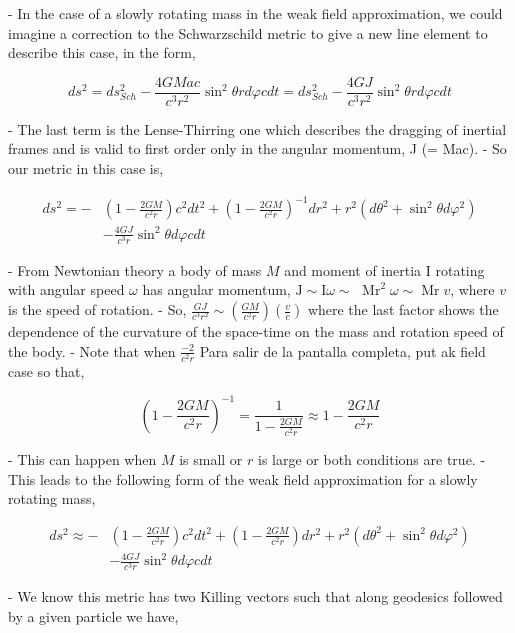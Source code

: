 - In the case of a slowly rotating mass in the weak field approximation, we could imagine a correction to the Schwarzschild metric to give a new line element to describe this case, in the form,

$$
    d s^2=d s_{S c h}^2-\frac{4 G M a c}{c^3 r^2} \sin ^2 \theta r d \varphi c d t=d s_{S c h}^2-\frac{4 G J}{c^3 r^2} \sin ^2 \theta r d \varphi c d t
$$

- The last term is the Lense-Thirring one which describes the dragging of inertial frames and is valid to first order only in the angular momentum, J (= Mac).
- So our metric in this case is,


\begin{align}
    d s^2=- & \left(1-\frac{2 G M}{c^2 r}\right) c^2 d t^2+\left(1-\frac{2 G M}{c^2 r}\right)^{-1} d r^2+r^2\left(d \theta^2+\sin ^2 \theta d \varphi^2\right) \\
            & -\frac{4 G J}{c^3 r} \sin ^2 \theta d \varphi c d t
\end{align}


- From Newtonian theory a body of mass $M$ and moment of inertia I rotating with angular speed $\omega$ has angular momentum, $\mathrm{J} \sim \mathrm{I} \omega \sim$ $\operatorname{Mr}^2 \omega \sim \operatorname{Mr} v$, where $v$ is the speed of rotation.
- So, $\frac{G J}{c^3 r^2} \sim\left(\frac{G M}{c^2 r}\right)\left(\frac{v}{c}\right)$ where the last factor shows the dependence of the curvature of the space-time on the mass and rotation speed of the body.
- Note that when $\frac{-2}{c^2 r}$ Para salir de la pantalla completa, put ak field case so that,

$$
    \left(1-\frac{2 G M}{c^2 r}\right)^{-1}=\frac{1}{1-\frac{2 G M}{c^2 r}} \approx 1-\frac{2 G M}{c^2 r}
$$

- This can happen when $M$ is small or $r$ is large or both conditions are true.
- This leads to the following form of the weak field approximation for a slowly rotating mass,


\begin{align}
    d s^2 \approx- & \left(1-\frac{2 G M}{c^2 r}\right) c^2 d t^2+\left(1-\frac{2 G M}{c^2 r}\right) d r^2+r^2\left(d \theta^2+\sin ^2 \theta d \varphi^2\right) \\
                   & -\frac{4 G J}{c^3 r} \sin ^2 \theta d \varphi c d t
\end{align}

- We know this metric has two Killing vectors such that along geodesics followed by a given particle we have,

